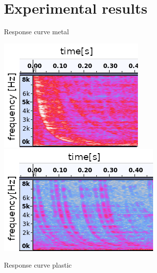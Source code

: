 \documentclass{beamer}
\begin{document}
\section {Experimental results}
	\begin{frame}{Response curve metal}
		\begin{center}
		
		\includegraphics [scale=0.7]{images/echo_1_axies.png}
		\includegraphics [scale=0.7]{images/echo_2_axies.png}
		\end{center}
	\end{frame}
	
	\begin{frame}{Response curve plastic}
		\begin{center}
			
		\end{center}
	\end{frame}
\end{document}
